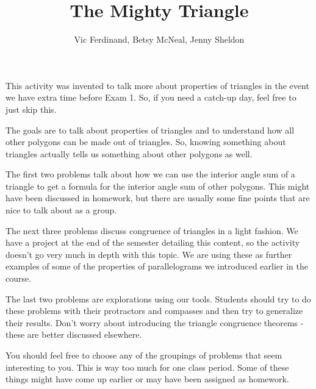 \documentclass[nooutcomes]{ximera}
\title{The Mighty Triangle}
\author{Vic Ferdinand, Betsy McNeal, Jenny Sheldon}
\begin{document}
\begin{abstract}
\end{abstract}
\maketitle

\begin{instructorIntro}
This activity was invented to talk more about properties of triangles in the event we have extra time before Exam 1.  So, if you need a catch-up day, feel free to just skip this.

The goals are to talk about properties of triangles and to understand how all other polygons can be made out of triangles.  So, knowing something about triangles actually tells us something about other polygons as well.

The first two problems talk about how we can use the interior angle sum of a triangle to get a formula for the interior angle sum of other polygons.  This might have been discussed in homework, but there are usually some fine points that are nice to talk about as a group.

The next three problems discuss congruence of triangles in a light fashion.  We have a project at the end of the semester detailing this content, so the activity doesn't go very much in depth with this topic.  We are using these as further examples of some of the properties of parallelograms we introduced earlier in the course.

The last two problems are explorations using our tools.  Students should try to do these problems with their protractors and compasses and then try to generalize their results.  Don't worry about introducing the triangle congruence theorems - these are better discussed elsewhere.

You should feel free to choose any of the groupings of problems that seem interesting to you.  This is way too much for one class period.  Some of these things might have come up earlier or may have been assigned as homework.

\end{instructorIntro}
\end{document}
